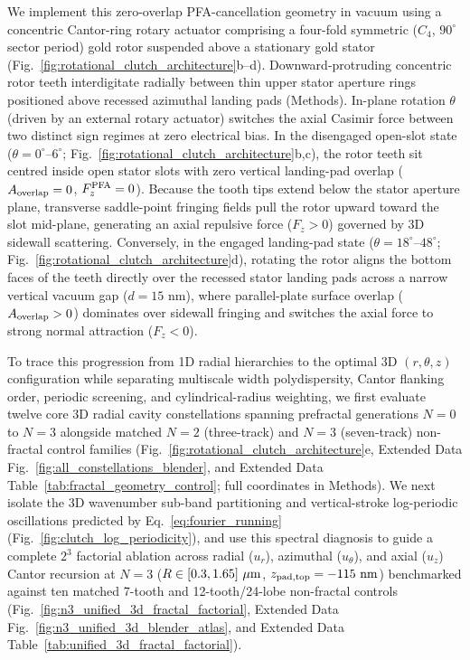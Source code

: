 \documentclass[pdflatex,sn-nature]{sn-jnl}
\begin{document}
We implement this zero-overlap PFA-cancellation geometry in vacuum using a concentric Cantor-ring rotary actuator comprising a four-fold symmetric ($C_4$, $90^\circ$ sector period) gold rotor suspended above a stationary gold stator (Fig.~\ref{fig:rotational_clutch_architecture}b--d). Downward-protruding concentric rotor teeth interdigitate radially between thin upper stator aperture rings positioned above recessed azimuthal landing pads (Methods). In-plane rotation $\theta$ (driven by an external rotary actuator) switches the axial Casimir force between two distinct sign regimes at zero electrical bias. In the disengaged open-slot state ($\theta = 0^\circ\text{--}6^\circ$; Fig.~\ref{fig:rotational_clutch_architecture}b,c), the rotor teeth sit centred inside open stator slots with zero vertical landing-pad overlap ($A_{\rm overlap} = 0$, $F_z^{\rm PFA} = 0$). Because the tooth tips extend below the stator aperture plane, transverse saddle-point fringing fields pull the rotor upward toward the slot mid-plane, generating an axial repulsive force ($F_z > 0$) governed by 3D sidewall scattering. Conversely, in the engaged landing-pad state ($\theta = 18^\circ\text{--}48^\circ$; Fig.~\ref{fig:rotational_clutch_architecture}d), rotating the rotor aligns the bottom faces of the teeth directly over the recessed stator landing pads across a narrow vertical vacuum gap ($d = 15\text{ nm}$), where parallel-plate surface overlap ($A_{\rm overlap} > 0$) dominates over sidewall fringing and switches the axial force to strong normal attraction ($F_z < 0$).

To trace this progression from 1D radial hierarchies to the optimal 3D $(r, \theta, z)$ configuration while separating multiscale width polydispersity, Cantor flanking order, periodic screening, and cylindrical-radius weighting, we first evaluate twelve core 3D radial cavity constellations spanning prefractal generations $N=0$ to $N=3$ alongside matched $N=2$ (three-track) and $N=3$ (seven-track) non-fractal control families (Fig.~\ref{fig:rotational_clutch_architecture}e, Extended Data Fig.~\ref{fig:all_constellations_blender}, and Extended Data Table~\ref{tab:fractal_geometry_control}; full coordinates in Methods). We next isolate the 3D wavenumber sub-band partitioning and vertical-stroke log-periodic oscillations predicted by Eq.~\eqref{eq:fourier_running} (Fig.~\ref{fig:clutch_log_periodicity}), and use this spectral diagnosis to guide a complete $2^3$ factorial ablation across radial ($u_r$), azimuthal ($u_\theta$), and axial ($u_z$) Cantor recursion at $N=3$ ($R \in [0.3{}, 1.65{}]\ \mu\text{m}$, $z_{\rm pad,top} = -115\text{ nm}$) benchmarked against ten matched 7-tooth and 12-tooth/24-lobe non-fractal controls (Fig.~\ref{fig:n3_unified_3d_fractal_factorial}, Extended Data Fig.~\ref{fig:n3_unified_3d_blender_atlas}, and Extended Data Table~\ref{tab:unified_3d_fractal_factorial}).
\end{document}
